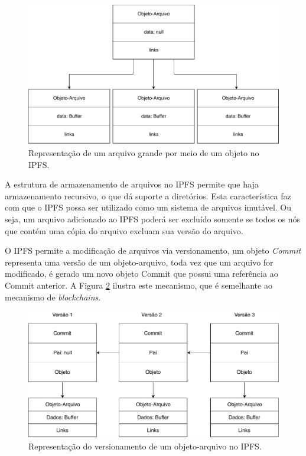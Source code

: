\documentclass[tcc,capa]{texufpel}
\begin{document}
    \begin{figure}[h!]
        \centering
        \includegraphics[width=15cm]{imagens/representacao-arquivo-grande-ipfs.pdf}
        \caption{Representação de um arquivo grande por meio de um objeto no IPFS.}
        \label{fig:representacao-arquivo-grande-ipfs}
    \end{figure}
    
    A estrutura de armazenamento de arquivos no IPFS permite que haja armazenamento recursivo, o que dá suporte a diretórios. Esta característica faz com que o IPFS possa ser utilizado como um sistema de arquivos imutável. Ou seja, um arquivo adicionado ao IPFS poderá ser excluído somente se todos os nós que contém uma cópia do arquivo excluam sua versão do arquivo.
    
    O IPFS permite a modificação de arquivos via versionamento, um objeto \textit{Commit} representa uma versão de um objeto-arquivo, toda vez que um arquivo for modificado, é gerado um novo objeto Commit que possui uma referência ao Commit anterior. A Figura \ref{fig:representacao-commit-ipfs} ilustra este mecanismo, que é semelhante ao mecanismo de \textit{blockchains}.
    
    \begin{figure}[h]
        \centering
        \includegraphics[width=16cm]{imagens/representacao-commit-ipfs.pdf}
        \caption{Representação do versionamento de um objeto-arquivo no IPFS.}
        \label{fig:representacao-commit-ipfs}
    \end{figure}
    
\end{document}

